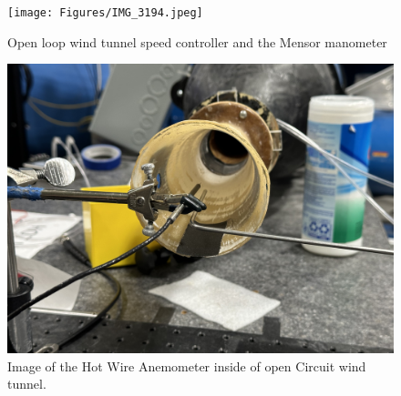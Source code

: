 \begin{figure}[htpb]
    \centering
    \texttt{[image: Figures/IMG\_3194.jpeg]}
    \caption[Open loop wind tunnel speed controller and the Mensor manometer]{Open loop wind tunnel speed controller and the Mensor manometer}
    \label{fig: SpeedControl}
\end{figure}

\begin{figure}[htpb]
    \centering
    \includegraphics[width=0.75\linewidth]{Figures/IMG_3195.jpeg}
    \caption[Image of the Hot Wire Anemometer inside of open Circuit wind tunnel.]{Image of the Hot Wire Anemometer inside of open Circuit wind tunnel.}
    \label{fig: HotWireAndPitotFairPicture}
\end{figure}


